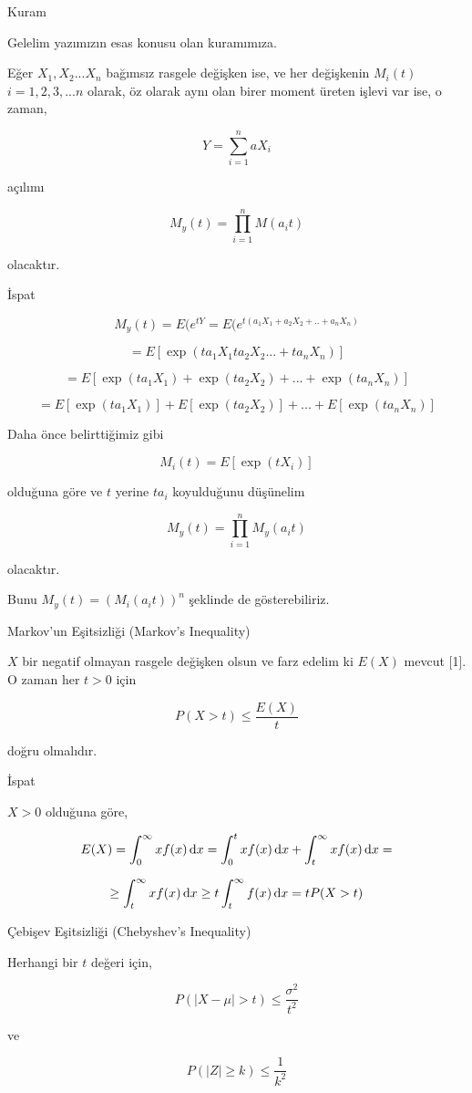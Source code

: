 \documentclass[12pt,fleqn]{article}\usepackage{../../common}
\begin{document}
Kuram

Gelelim yazımızın esas konusu olan kuramımıza.

Eğer $X_1, X_2...X_n$ bağımsız rasgele değişken ise, ve her değişkenin
$M_i(t)$ $i=1,2,3,...n$ olarak, öz olarak aynı olan birer moment üreten
işlevi var ise, o zaman,

$$ Y = \sum_{i=1}^n  aX_i $$

açılımı

$$ M_y(t) = \prod_{i=1}^n M(a_i t) $$

olacaktır. 

İspat

$$ M_y(t) = E(e^{tY}=E(e^{t(a_1X_1+a_2X_2+..+a_nX_n)} $$

$$ = E[\exp(ta_1 X_1 ta_2X_2...+ta_nX_n)] $$

$$ = E[\exp(ta_1X_1)+\exp(ta_2X_2)+ ... + \exp(ta_nX_n)] $$

$$ = E[\exp(ta_1X_1)]+E[\exp(ta_2X_2)]+ ... + E[\exp(ta_nX_n)]$$

Daha önce belirttiğimiz gibi

$$ M_i(t) = E[\exp(tX_i)] $$

olduğuna göre ve $t$ yerine $ta_i$ koyulduğunu düşünelim

$$ M_y(t) = \prod_{i=1}^n M_y(a_it) $$

olacaktır. 

Bunu $M_y(t)= (M_i(a_it))^n$ şeklinde de gösterebiliriz. 

Markov'un Eşitsizliği (Markov's Inequality)

$X$ bir negatif olmayan rasgele değişken olsun ve farz edelim ki $E(X)$
mevcut [1]. O zaman her $t > 0$ için

$$ P(X>t) \le \frac{E(X)}{t}$$

doğru olmalıdır. 

İspat

$X > 0$ olduğuna göre, 

$$ 
E(X) 
= \int _{0}^{\infty} x f(x) \,\mathrm{d} x 
= \int _{0}^{t} x f(x) \,\mathrm{d} x + \int _{t}^{\infty} x f(x) \,\mathrm{d} x =
$$

$$ 
\ge \int _{t}^{\infty} x f(x) \,\mathrm{d} x \ge t \int _{t}^{\infty} f(x) \,\mathrm{d} x
= t P(X > t)
$$

Çebişev Eşitsizliği (Chebyshev's Inequality)

Herhangi bir $t$ değeri için, 

$$ P(|X-\mu| > t) \le \frac{\sigma^2}{t^2} $$

ve 

$$ P(|Z| \ge k) \le \frac{1}{k^2}$$
\end{document}
